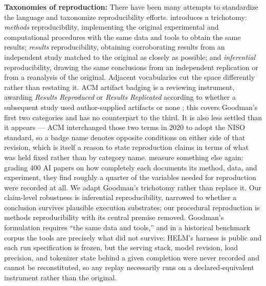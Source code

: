 \textbf{Taxonomies of reproduction:} There have been many attempts to standardize the language and taxonomize reproducibility efforts. \citet{goodman2016does} introduces a trichotomy: \emph{methods} reproducibility, implementing the original experimental and computational procedures with the same data and tools to obtain the same results; \emph{results} reproducibility, obtaining corroborating results from an independent study matched to the original as closely as possible; and \emph{inferential} reproducibility, drawing the same conclusions from an independent replication or from a reanalysis of the original. Adjacent vocabularies cut the space differently rather than restating it. ACM artifact badging is a reviewing instrument, awarding \emph{Results Reproduced} or \emph{Results Replicated} according to whether a subsequent study used author-supplied artifacts or none \citep{acm2020badging}; this covers Goodman's first two categories and has no counterpart to the third. It is also less settled than it appears --- ACM interchanged those two terms in 2020 to adopt the NISO standard, so a badge name denotes opposite conditions on either side of that revision, which is itself a reason to state reproduction claims in terms of what was held fixed rather than by category name. \citet{gundersen2018state} measure something else again: grading 400 AI papers on how completely each documents its method, data, and experiment, they find roughly a quarter of the variables needed for reproduction were recorded at all. We adapt Goodman's trichotomy rather than replace it. Our claim-level robustness is inferential reproducibility, narrowed to whether a conclusion survives plausible execution substrates; our procedural reproduction is methods reproducibility with its central premise removed. Goodman's formulation requires ``the same data and tools,'' and in a historical benchmark corpus the tools are precisely what did not survive: HELM's harness is public and each run specification is frozen, but the serving stack, model revision, load precision, and tokenizer state behind a given completion were never recorded and cannot be reconstituted, so any replay necessarily runs on a declared-equivalent instrument rather than the original.

